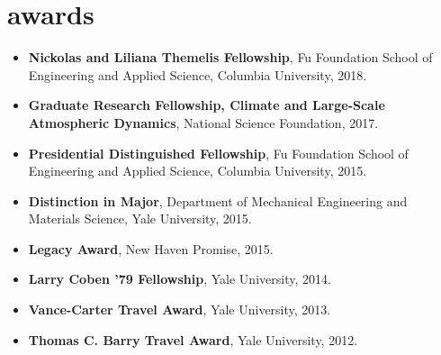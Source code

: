 \documentclass[10pt,oneside]{article}
\begin{document}

\section{\color{BrickRed}awards}

\mbox{}\vspace{-\dimexpr\baselineskip\relax}

\begin{itemize}[label={}]
  
  \item \textbf{Nickolas and Liliana Themelis Fellowship}, Fu Foundation School of Engineering and Applied Science, Columbia University, 2018.
        
  \item \textbf{Graduate Research Fellowship, Climate and Large-Scale Atmospheric Dynamics}, National Science Foundation, 2017.
        
  \item \textbf{Presidential Distinguished Fellowship}, Fu Foundation School of Engineering and Applied Science, Columbia University, 2015.
        
  \item \textbf{Distinction in Major}, Department of Mechanical Engineering and Materials Science, Yale University, 2015.
        
  \item \textbf{Legacy Award}, New Haven Promise, 2015.
        
  \item \textbf{Larry Coben ’79 Fellowship}, Yale University, 2014.
        
  \item \textbf{Vance-Carter Travel Award}, Yale University, 2013.
        
  \item \textbf{Thomas C. Barry Travel Award}, Yale University, 2012.
        
\end{itemize}


%
%
%
%  
%        
%        
\end{document}
